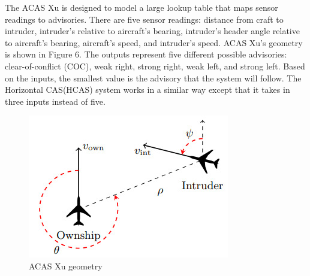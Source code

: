 The ACAS Xu is designed to model a large lookup table that maps sensor readings to advisories. There are five sensor readings: distance from craft to intruder, intruder's relative to aircraft's bearing, intruder's header angle relative to aircraft's bearing, aircraft's speed, and intruder's speed. ACAS Xu's geometry is shown in Figure 6. The outputs represent five different possible advisories: clear-of-conflict (COC), weak right, strong right, weak left, and strong left. Based on the inputs, the smallest value is the advisory that the system will follow. The Horizontal CAS(HCAS) system works in a similar way except that it takes in three inputs instead of five. %


\begin{figure}
	\centering
	\includegraphics[width=0.7\linewidth]{Images/ACASXugeometry}
	\caption[ACAS Xu]{ACAS Xu geometry}
	\label{fig:acasxugeometry}
\end{figure}

